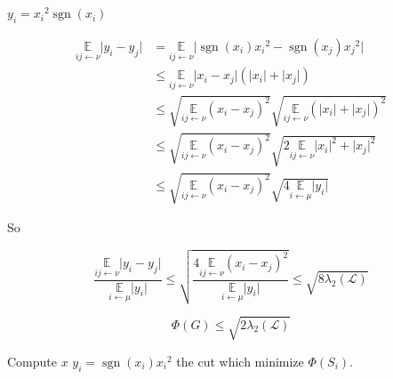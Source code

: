 \documentclass[12pt]{article}
\newcommand{\EE}{\mathbb{E}}
\renewcommand{\L}{\mathcal{L}}
\newcommand{\la}{\leftarrow}
\DeclareMathOperator{\sgn}{sgn}
\begin{document}
$y_i = {x_i}^2 \sgn(x_i)$

\[
    \begin{aligned}
        \underset{ij\la\nu}{\EE} \lvert y_i - y_j \rvert &= \underset{ij \la \nu}{\EE} \lvert \sgn(x_i){x_i}^2 - \sgn(x_j){x_j}^2\rvert\\
        &\leqslant \underset{ij\la \nu}{\EE} \lvert x_i-x_j \rvert(\lvert x_i \rvert + \lvert x_j \rvert)\\
        &\leqslant \sqrt{\underset{ij\la\nu}{\EE}(x_i-x_j)^2} \sqrt{\underset{ij\la \nu}{\EE} (\lvert x_i \rvert + \lvert x_j \rvert)^2}\\
        &\leqslant \sqrt{\underset{ij\la\nu}{\EE}(x_i-x_j)^2} \sqrt{2\underset{ij\la \nu}{\EE} \lvert x_i \rvert^2 + \lvert x_j \rvert^2}\\
        &\leqslant \sqrt{\underset{ij\la\nu}{\EE}(x_i-x_j)^2} \sqrt{4\underset{i\la \mu}{\EE} \lvert y_i \rvert}
    \end{aligned}
\]


So

\[
    \frac{\underset{ij\la\nu}{\EE}\lvert y_i-y_j \rvert}{\underset{i\la\mu}{\EE}\lvert y_i \rvert} \leqslant \sqrt{\frac{4 \underset{ij\la\nu}{\EE}(x_i-x_j)^2}{\underset{i\la\mu}{\EE}\lvert y_i \rvert}} \leqslant\sqrt{8\lambda_2(\L)}
\]

\[
    \Phi(G) \leqslant \sqrt{2\lambda_2(\L)}
\]

\begin{algorithm}[!ht]
    \DontPrintSemicolon
    Compute $x$\;
    $y_i = \sgn(x_i){x_i}^2$\;
    \Return the cut which minimize $\Phi(S_i)$.
\end{algorithm}



\end{document}
